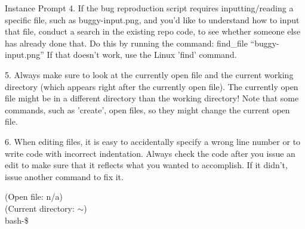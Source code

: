 {\begin{promptbox}{Instance Prompt}
4. If the bug reproduction script requires inputting/reading a specific file, such as buggy-input.png, and you'd like to understand how to input that file, conduct a search in the existing repo code, to see whether someone else has already done that. Do this by running the command: find\_file ``buggy-input.png'' If that doesn't work, use the Linux 'find' command. 

5. Always make sure to look at the currently open file and the current working directory (which appears right after the currently open file). The currently open file might be in a different directory than the working directory! Note that some commands, such as 'create', open files, so they might change the current  open file.

6. When editing files, it is easy to accidentally specify a wrong line number or to write code with incorrect indentation. Always check the code after you issue an edit to make sure that it reflects what you wanted to accomplish. If it didn't, issue another command to fix it.
\smallskip

(Open file: n/a) \\ 
(Current directory: $\sim$) \\
bash-\$ 
\end{promptbox}%
\captionsetup{type=figure}
}
